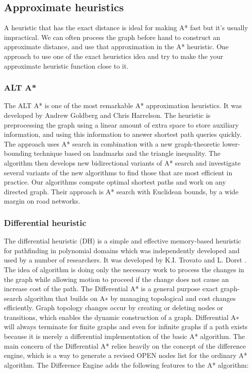 \documentclass[12pt]{article}
\begin{document}
\subsection{Approximate heuristics}
A heuristic that has the exact distance is ideal for making A* fast but it’s usually impractical. We can often process the graph before hand to construct an approximate distance, and use that approximation in the A* heuristic. One approach to use one of the exact heuristics idea and try to make the your approximate heuristic function close to it.

\subsubsection{ALT A*}
The ALT A* is one of the most remarkable A* approximation heuristics. It was developed by Andrew Goldberg and Chris Harrelson\cite{goldberg2005computing}. The heuristic is preprocessing the graph using a linear amount of extra space to store auxiliary information, and using this information to answer shortest path queries quickly. The approach uses A* search in combination with a new graph-theoretic lower-bounding technique based on landmarks and the triangle inequality. The algorithm then develops new bidirectional variants of A* search and investigate several variants of the new algorithms to find those that are most efficient in practice. Our algorithms compute optimal shortest paths and work on any directed graph. Their approach is A* search with Euclidean bounds, by a wide margin on road networks.

\subsubsection{Differential heuristic}
The differential heuristic (DH) is a simple and effective memory-based heuristic for pathfinding in polynomial domains which was independently developed and used by a number of researchers. It was developed by K.I. Trovato and L. Dorst \cite{lv2006numerical} \cite{krishnamurthy2007godzila} \cite{wilson2007swan}. The idea of algorithm is doing only the necessary work to process the changes in the graph while allowing motion to proceed if the change does not cause an increase cost of the path. The Differential A* is a general purpose exact graph-search algorithm that builds on A∗ by managing topological and cost changes efficiently. Graph topology changes occur by creating or deleting nodes or transitions, which enables the dynamic construction of a graph. Differential A∗ will always terminate for finite graphs and even for infinite graphs if a path exists because it is merely a differential implementation of the basic A* algorithm. The main concern of the Differential A* relies heavily on the concept of the difference engine, which is a way to generate a revised OPEN nodes list for the ordinary A* algorithm. The Difference Engine adds the following features to the A* algorithm: 
\end{document}

